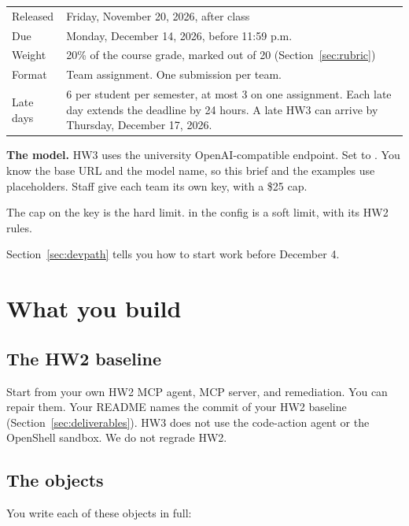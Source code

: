 \documentclass[9pt,letterpaper]{article}
\begin{document}
\begin{center}
\begin{tabularx}{\linewidth}{@{}lX@{}}
\toprule
Released & Friday, November 20, 2026, after class \\
Due & Monday, December 14, 2026, before 11:59 p.m. \\
Weight & 20\% of the course grade, marked out of 20 (Section~\ref{sec:rubric}) \\
Format & Team assignment. One submission per team. \\
Late days & 6 per student per semester, at most 3 on one assignment. Each late day extends the deadline by 24 hours. A late HW3 can arrive by Thursday, December 17, 2026. \\
\bottomrule
\end{tabularx}
\end{center}

\textbf{The model.} HW3 uses the university OpenAI-compatible endpoint. Set
 to . You know the base URL and
the model name, so this brief and the examples use placeholders. Staff give each
team its own key, with a \$25 cap.

The cap on the key is the hard limit.
 in the config is a soft limit, with its HW2 rules.

Section~\ref{sec:devpath} tells you how to start work before December 4.

\section{What you build}\label{sec:build}

\subsection{The HW2 baseline}\label{sec:baseline}

Start from your own HW2 MCP agent, MCP server, and remediation. You can repair
them. Your README names the commit of your HW2 baseline
(Section~\ref{sec:deliverables}). HW3 does not use the code-action agent or the
OpenShell sandbox. We do not regrade HW2.

\subsection{The objects}\label{sec:objects}

You write each of these objects in full:
\end{document}
